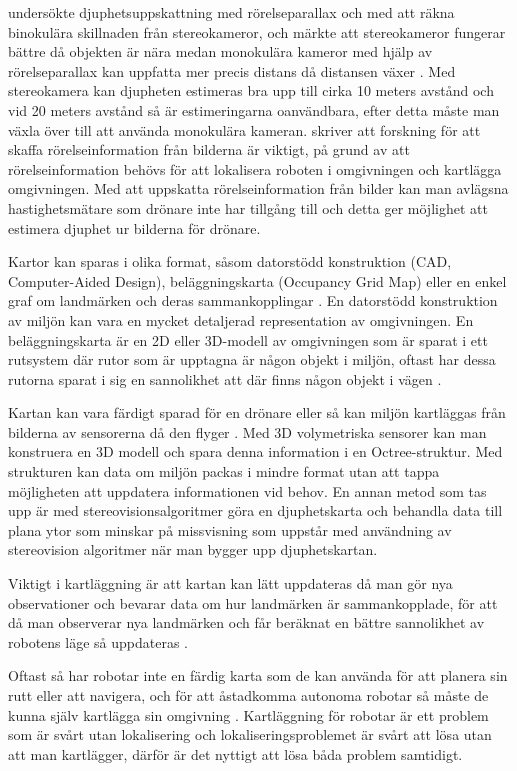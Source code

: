 \cite{suomimainittu} undersökte djuphetsuppskattning med rörelseparallax och med att räkna binokulära skillnaden från stereokameror, och märkte att stereokameror fungerar bättre då objekten är nära medan monokulära kameror med hjälp av rörelseparallax kan uppfatta mer precis distans då distansen växer \citep{suomimainittu}. Med stereokamera kan djupheten estimeras bra upp till cirka 10 meters avstånd och vid 20 meters avstånd så är estimeringarna oanvändbara, efter detta måste man växla över till att använda monokulära kameran. \cite{suomimainittu} skriver att forskning för att skaffa rörelseinformation från bilderna är viktigt, på grund av att rörelseinformation behövs för att lokalisera roboten i omgivningen och kartlägga omgivningen. Med att uppskatta rörelseinformation från bilder kan man avlägsna hastighetsmätare som drönare inte har tillgång till och detta ger möjlighet att estimera djuphet ur bilderna för drönare.

Kartor kan sparas i olika format, såsom datorstödd konstruktion (CAD, Computer-Aided Design), beläggningskarta (Occupancy Grid Map) eller en enkel graf om landmärken och deras sammankopplingar \citep{982903}. En datorstödd konstruktion av miljön kan vara en mycket detaljerad representation av omgivningen. En beläggningskarta är en 2D eller 3D-modell av omgivningen som är sparat i ett rutsystem där rutor som är upptagna är någon objekt i miljön, oftast har dessa rutorna sparat i sig en sannolikhet att där finns någon objekt i vägen \citep{6095058, 982903}. 

Kartan kan vara färdigt sparad för en drönare eller så kan miljön kartläggas från bilderna av sensorerna då den flyger \citep{geospatial}. Med 3D volymetriska sensorer kan man konstruera en 3D modell och spara denna information i en Octree-struktur. Med strukturen kan data om miljön packas i mindre format utan att tappa möjligheten att uppdatera informationen vid behov. En annan metod som tas upp är med stereovisionsalgoritmer göra en djuphetskarta och behandla data till plana ytor som minskar på missvisning som uppstår med användning av stereovision algoritmer när man bygger upp djuphetskartan. 

Viktigt i kartläggning är att kartan kan lätt uppdateras då man gör nya observationer och bevarar data om hur landmärken är sammankopplade, för att då man observerar nya landmärken och får beräknat en bättre sannolikhet av robotens läge så uppdateras  \citep{globalsubmaps}.

Oftast så har robotar inte en färdig karta som de kan använda för att planera sin rutt eller att navigera, och för att åstadkomma autonoma robotar så måste de kunna själv kartlägga sin omgivning \citep{ProbabilisticRobotics}. Kartläggning för robotar är ett problem som är svårt utan lokalisering och lokaliseringsproblemet är svårt att lösa utan att man kartlägger, därför är det nyttigt att lösa båda problem samtidigt. 

